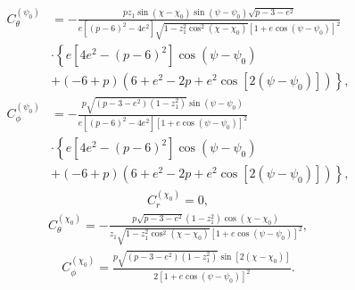 \documentclass[aps,prx,reprint,superscriptaddress,nofootinbib,longbibliography]{revtex4-1}
\begin{document}
\begin{equation}
    \begin{aligned}
         C^{(\psi_{0})}_{\theta}&=-\frac{pz_{1}\sin(\chi-\chi_{0})\sin(\psi-\psi_{0})\sqrt{p-3-e^{2}}}{e[(p-6)^{2}-4e^{2}]\sqrt{1-z_{1}^{2}\cos^{2}(\chi-\chi_{0})}[1+e\cos(\psi-\psi_{0})]^{2}}\\
        &\cdot\left\{e[4e^{2}-(p-6)^{2}]\cos(\psi-\psi_{0})\right.\\
        &\left.+(-6+p)(6+e^{2}-2p+e^{2}\cos[2(\psi-\psi_{0})])\right\},
    \end{aligned}
\end{equation}
\begin{equation}
    \begin{aligned}
         C^{(\psi_{0})}_{\phi}&=-\frac{p\sqrt{(p-3-e^{2})(1-z_{1}^{2})}\sin(\psi-\psi_{0})}{e[(p-6)^{2}-4e^{2}][1+e\cos(\psi-\psi_{0})]^{2}}\\
        &\cdot\left\{e[4e^{2}-(p-6)^{2}]\cos(\psi-\psi_{0})\right.\\
        &\left.+(-6+p)(6+e^{2}-2p+e^{2}\cos[2(\psi-\psi_{0})])\right\},
    \end{aligned}
\end{equation}
\begin{equation}
    \begin{aligned}
        C^{(\chi_{0})}_{r}=0,
    \end{aligned}
\end{equation}
\begin{equation}
    \begin{aligned}
        C^{(\chi_{0})}_{\theta}=-\frac{p\sqrt{p-3-e^{2}}(1-z_{1}^{2})\cos(\chi-\chi_{0})}{z_{1}\sqrt{1-z_{1}^{2}\cos^{2}(\chi-\chi_{0})}[1+e\cos(\psi-\psi_{0})]^{2}},
    \end{aligned}
\end{equation}
\begin{equation}
    \begin{aligned}
        C^{(\chi_{0})}_{\phi}=\frac{p\sqrt{(p-3-e^{2})(1-z_{1}^{2})}\sin[2(\chi-\chi_{0})]}{2[1+e\cos(\psi-\psi_{0})]^{2}}.
    \end{aligned}
\end{equation}
\end{document}
